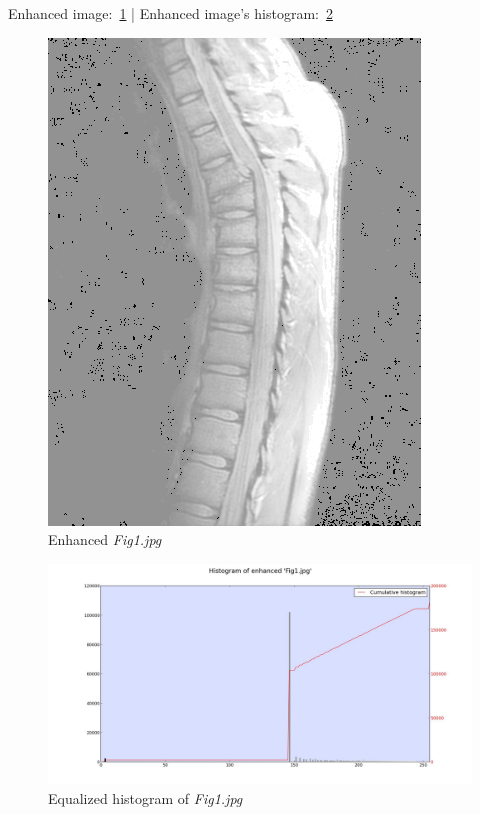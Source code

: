     Enhanced image:~\ref{diagram:enhanced_fig1} |
    Enhanced image's histogram:~\ref{diagram:equal_hist_fig1}

    \begin{figure}[h]
        \centering
        \includegraphics[width=0.7\linewidth]{./images/Enhanced_Fig1.jpg}
        \caption{Enhanced \textit{Fig1.jpg}}
        \label{diagram:enhanced_fig1}
    \end{figure}

    \begin{figure}[h]
        \centering
        \includegraphics[width=\linewidth]{./images/Equalized_Histogram_Fig1.jpg}
        \caption{Equalized histogram of \textit{Fig1.jpg}}
        \label{diagram:equal_hist_fig1}
    \end{figure}


